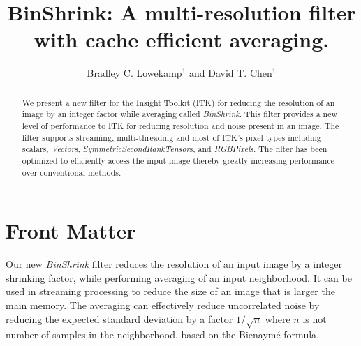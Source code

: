 \documentclass{InsightArticle}
\title{BinShrink: A multi-resolution filter with cache efficient averaging. }
\author{Bradley C. Lowekamp$^{1}$ and David T. Chen$^{1}$}
\newcommand{\IJhandlerIDnumber}{0}
\begin{document}
%
%
\IJhandlefooter{\IJhandlerIDnumber}


\ifpdf
\else
\fi


\maketitle


\ifhtml
\chapter*{Front Matter\label{front}}
\fi

\begin{abstract}
\noindent
We present a new filter for the Insight Toolkit (ITK) for reducing the
resolution of an image by an integer factor while averaging called
\textit{BinShrink}. This filter provides a new level of performance to
ITK for reducing resolution and noise present in an image. The filter
supports streaming, multi-threading and most of ITK's pixel types
including scalars, \textit{Vector}s,
\textit{SymmetricSecondRankTensor}s, and \textit{RGBPixel}s. The
filter has been optimized to efficiently access the input image thereby
greatly increasing performance over conventional methods.

\end{abstract}

\IJhandlenote{\IJhandlerIDnumber}

\tableofcontents

Our new \textit{BinShrink} filter reduces the resolution of an input
image by a integer shrinking factor, while performing averaging of an
input neighborhood. It can be used in streaming processing to reduce
the size of an image that is larger the main memory. The averaging can
effectively reduce uncorrelated noise by reducing the expected
standard deviation by a factor $1/\sqrt{n}$ where $n$ is not number of
samples in the neighborhood, based on the Bienaymé formula.
\end{document}

